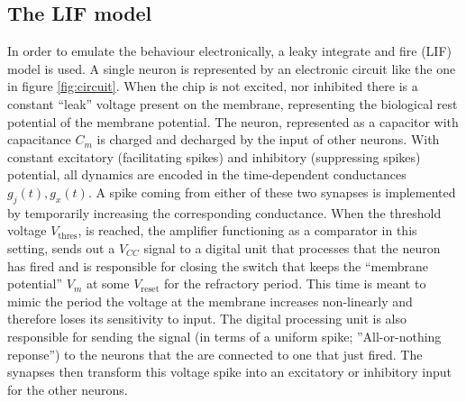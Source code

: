 \documentclass[a4paper,twocolumn]{article}
\begin{document}
\subsection{The LIF model}
In order to emulate the behaviour electronically, a leaky integrate and fire
(LIF) model is used. A single neuron is represented by an electronic circuit
like the one in figure \ref{fig:circuit}. When the chip is not excited, nor
inhibited there is a constant ``leak'' voltage present on the membrane,
representing the biological rest potential of the membrane potential.  The neuron, 
represented as a capacitor with capacitance $C_m$ is charged and decharged 
by the input of other neurons. With constant excitatory (facilitating spikes) and 
inhibitory (suppressing spikes) potential,  all dynamics are encoded in the 
time-dependent conductances $g_j(t),  g_x(t)$.  A spike coming from either 
of these two synapses is implemented by temporarily increasing the corresponding 
conductance.  When the threshold voltage $V_\text{thres}$,  is reached,  
the amplifier functioning as a comparator in this setting,  sends out a 
$V_{CC}$ signal to a digital unit that processes that the neuron has fired 
and is responsible for closing the switch that keeps the 
``membrane potential'' $V_m$ at some $V_\text{reset}$ for the refractory
period. This time is meant to mimic the period the voltage at the membrane
increases non-linearly and therefore loses its sensitivity to input. The digital
processing unit is also responsible for sending the signal (in terms of a 
uniform spike; ''All-or-nothing reponse'') to the neurons that the are 
connected to one that just fired.  The synapses then transform this voltage 
spike into an excitatory or inhibitory input for the other neurons.
\end{document}
